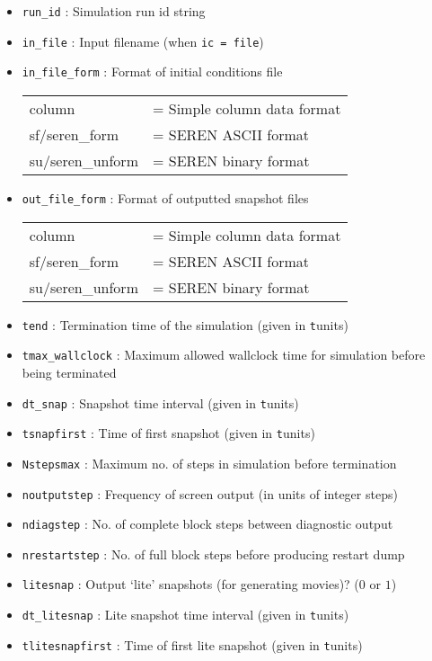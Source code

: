\documentclass[a4paper]{article}
\newcommand{\var}[1]{\texttt{#1}}
\begin{document}
\begin{itemize}
\item \var{run\_id}  : Simulation run id string

\item \var{in\_file} : Input filename (when \var{ic = file})

\item \var{in\_file\_form} : Format of initial conditions file \\
\begin{tabular}{ll}
column           & = Simple column data format \\
sf/seren\_form   & = SEREN ASCII format \\
su/seren\_unform & = SEREN binary format
\end{tabular}

\item \var{out\_file\_form} : Format of outputted snapshot files \\
\begin{tabular}{ll}
column           & = Simple column data format \\
sf/seren\_form   & = SEREN ASCII format \\
su/seren\_unform & = SEREN binary format
\end{tabular}

\item \var{tend} : Termination time of the simulation (given in {\var tunit}s)

\item \var{tmax\_wallclock} : Maximum allowed wallclock time for simulation before being terminated

\item \var{dt\_snap} : Snapshot time interval (given in {\var tunit}s)

\item \var{tsnapfirst} : Time of first snapshot (given in {\var tunit}s)

\item \var{Nstepsmax} : Maximum no. of steps in simulation before termination

\item \var{noutputstep} : Frequency of screen output (in units of integer steps)

\item \var{ndiagstep} : No. of complete block steps between diagnostic output

\item \var{nrestartstep} : No. of full block steps before producing restart dump

\item \var{litesnap} : Output `lite' snapshots (for generating movies)? ($0$ or $1$)

\item \var{dt\_litesnap} : Lite snapshot time interval (given in {\var tunit}s)

\item \var{tlitesnapfirst} : Time of first lite snapshot (given in {\var tunit}s)

\end{itemize}
\end{document}

